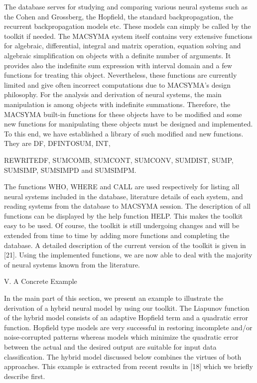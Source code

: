 The database serves for studying and comparing various neural systems
such as
the Cohen and Grossberg, the Hopfield, the standard backpropagation, 
the recurrent backpropagation 
models etc. These models can simply be called by the toolkit if needed. 
The MACSYMA system itself contains very extensive functions for
algebraic, 
differential, integral and matrix operation, equation 
solving and algebraic simplification on objects with a definite number
of 
arguments. It provides also the indefinite sum expression with interval
domain
and a few functions for treating this object. 
Nevertheless, these functions are currently limited and give often
incorrect
computations due to MACSYMA's design philosophy. For the analysis and 
derivation of neural systems, the main manipulation is among objects
with 
indefinite summations. Therefore, the MACSYMA built-in functions for
these 
objects have to be modified and some new functions for manipulating
these 
objects must be designed and implemented. To this end, we have
established a 
library of such modified and new functions. They are DF, DFINTOSUM, INT,

REWRITEDF, SUMCOMB, SUMCONT, SUMCONV, SUMDIST, SUMP, SUMSIMP, SUMSIMPD 
and SUMSIMPM. 

The functions WHO, WHERE and CALL are used respectively for listing all 
neural systems included in the database, literature details of each
system, 
and reading systems from the database to MACSYMA session. 
The description of all functions can be displayed by the help function
HELP. 
This makes the toolkit easy to be used. Of course, the toolkit is still 
undergoing changes and will
be extended from time to time by adding more functions and completing
the 
database. A detailed description of the current version of the toolkit
is 
given in [21]. Using the implemented functions, we are now able to 
deal with the majority of neural systems known from the literature.     

\bigskip
\noindent    
\centerline{\sc V. A Concrete Example}

\smallskip
\noindent
In the main part of this section, we present an example to illustrate
the 
derivation of a hybrid neural model by using our toolkit. 
The Liapunov function of the hybrid model consists of an adaptive
Hopfield term
and a quadratic error function. Hopfield type models are very successful
in 
restoring incomplete and/or noise-corrupted patterns whereas models
which minimize
the quadratic error between the actual and the desired output are
suitable for input 
data classification. The hybrid model discussed below combines the
virtues of both
approaches. This example is extracted from recent results in [18] which
we 
briefly describe first. 

